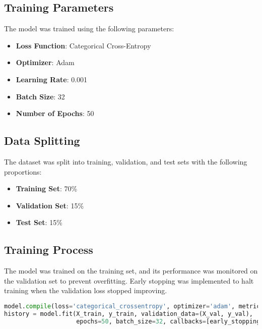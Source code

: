 \documentclass[12pt]{article}
\begin{document}
\subsection{Training Parameters}

The model was trained using the following parameters:

\begin{itemize}
    \item \textbf{Loss Function}: Categorical Cross-Entropy
    \item \textbf{Optimizer}: Adam
    \item \textbf{Learning Rate}: 0.001
    \item \textbf{Batch Size}: 32
    \item \textbf{Number of Epochs}: 50
\end{itemize}

\subsection{Data Splitting}

The dataset was split into training, validation, and test sets with the following proportions:

\begin{itemize}
    \item \textbf{Training Set}: 70\%
    \item \textbf{Validation Set}: 15\%
    \item \textbf{Test Set}: 15\%
\end{itemize}

\subsection{Training Process}

The model was trained on the training set, and its performance was monitored on the validation set to prevent overfitting. Early stopping was implemented to halt training when the validation loss stopped improving.

\begin{lstlisting}[language=Python, caption=Model Training]
model.compile(loss='categorical_crossentropy', optimizer='adam', metrics=['accuracy'])
history = model.fit(X_train, y_train, validation_data=(X_val, y_val),
                    epochs=50, batch_size=32, callbacks=[early_stopping])
\end{lstlisting}

\newpage
\end{document}
